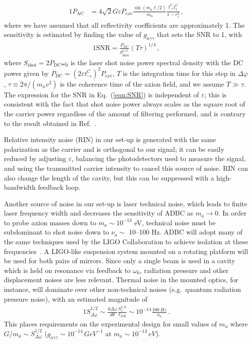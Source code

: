 \documentclass[aps,prd,nofootinbib,twocolumn,superscriptaddress,preprintnumbers,letterpaper, longbibliography]{revtex4-1}
\begin{document}
\begin{alignat}{1}
	P_\text{AC} &= 4 \sqrt{2} G \varepsilon P_\text{cav} \frac{\sin \left(m_a \ell/2 \right)}{m_a}  \frac{t^C_\rightarrow  t^C_\uparrow}{1 - r_\uparrow^2} \,,
    \label{eqn:ACPower}
\end{alignat}
where we have assumed that all reflectivity coefficients are approximately 1. The sensitivity is estimated by finding the value of $g_{a\gamma\gamma}$ that sets the SNR to 1, with~\cite{Budker:2013hfa}
\begin{alignat}{1}
	\text{SNR} = \frac{P_\text{AC}}{S_\text{shot}^{1/2}} (T \tau)^{1/4} \,, 
    \label{eqn:SNR}
\end{alignat}
 where $S_\text{shot} = 2 P_\text{DC} \omega_0$ is the laser shot noise power spectral density with the DC power given by $P_\text{DC} = (2 \varepsilon t^C_\rightarrow)^2 P_\text{cav}$, $T$ is the integration time for this step in $\Delta \varphi$, $\tau \equiv 2\pi/(m_a v^2)$ is the coherence time of the axion field, and we assume $T \gg \tau$. The expression for the SNR in Eq.~(\ref{eqn:SNR}) is independent of $\varepsilon$; this is consistent with the fact that shot noise power always scales as the square root of the carrier power regardless of the amount of filtering performed, and is contrary to the result obtained in Ref.~\cite{Melissinos:2008vn}. 

Relative intensity noise (RIN) in our set-up is generated with the same polarization as the carrier and is orthogonal to our signal; it can be easily reduced by adjusting $\varepsilon$, balancing the photodetectors used to measure the signal, and using the transmitted carrier intensity to cancel this source of noise. RIN can also change the length of the cavity, but this can be suppressed with a high-bandwidth feedback loop.  

Another source of noise in our set-up is laser technical noise, which leads to finite laser frequency width and decreases the sensitivity of ADBC as $m_a \to 0$. In order to probe axion masses down to $m_a \sim 10^{-13}$ eV, technical noise must be subdominant to shot noise down to $\nu_a \sim $ 10--100 Hz. ADBC will adopt many of the same techniques used by the LIGO Collaboration to achieve isolation at these frequencies~\cite{Cook:2012tu}. A LIGO-like suspension system mounted on a rotating platform will be used for both pairs of mirrors. Since only a single beam is used in a cavity which is held on resonance via feedback to $\omega_0$, radiation pressure and other displacement noises are less relevant. Thermal noise in the mounted optics, for instance, will dominate over other non-technical noises (e.g.\ quantum radiation pressure noise),
with an estimated magnitude of~\cite{Gonzalez1994}
%
\begin{alignat}{1}
    S_{\Delta \varphi}^{1/2} \sim \frac{d \Delta \varphi}{d \theta} \frac{S_x^{1/2}}{\ell_{DB}} \sim 10^{-14} \frac{\SI{100}{Hz}}{\nu_a}\,.
    \label{eqn:thermal_noise}
\end{alignat}
%
This places requirements on the experimental design for small values of $m_a$ where $G/m_a \sim S_{\Delta \varphi}^{1/2}$ ($g_{a\gamma\gamma} \sim 10^{-14}\,\si{GeV^{-1}}$ at $m_a \sim 10^{-13}\,\si{eV}$).
\end{document}
